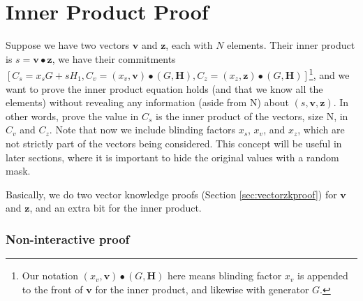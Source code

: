 \section{Inner Product Proof}

Suppose we have two vectors $\boldsymbol{v}$ and $\boldsymbol{z}$, each with $N$ elements. Their inner product is $s = \boldsymbol{v} \bullet \boldsymbol{z}$, we have their commitments $[C_s = x_s G + s H_1, C_v = (x_v, \boldsymbol{v}) \bullet (G,\boldsymbol{H}), C_z = (x_z, \boldsymbol{z}) \bullet (G,\boldsymbol{H})]$\footnote{Our notation $(x_v, \boldsymbol{v}) \bullet (G,\boldsymbol{H})$ here means blinding factor $x_v$ is appended to the front of $\boldsymbol{v}$ for the inner product, and likewise with generator $G$.}, and we want to prove the inner product equation holds (and that we know all the elements) without revealing any information (aside from N) about $(s, \boldsymbol{v}, \boldsymbol{z})$. In other words, prove the value in $C_s$ is the inner product of the vectors, size N, in $C_v$ and $C_z$. Note that now we include blinding factors $x_s$, $x_v$, and $x_z$, which are not strictly part of the vectors being considered. This concept will be useful in later sections, where it is important to hide the original values with a random mask.

Basically, we do two vector knowledge proofs (Section \ref{sec:vectorzkproof}) for $\boldsymbol{v}$ and $\boldsymbol{z}$, and an extra bit for the inner product.


\subsubsection*{Non-interactive proof}

